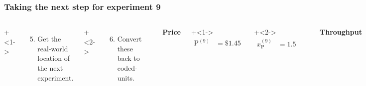 \documentclass[handout,11pt,aspectratio=169,mathserif]{beamer}
\begin{document}
\begin{frame}\frametitle{Taking the next step for experiment 9}
	\begin{columns}[T]

			\vspace{1cm}
			\onslide+<1->{
				{\tiny 
					\begin{enumerate}\setcounter{enumi}{4}
						\item	Get the real-world location
						of the next experiment.
					\end{enumerate}
				
				\par}
			}
			
			\onslide+<2->{
				{\tiny 
					\begin{enumerate}\setcounter{enumi}{5}
						\item	Convert these back to coded-units.
					\end{enumerate}
				
				\par}
			}
			
				
			\rule[3mm]{0.01cm}{25mm}%
			
			
			\centerline{\textbf{Price}}
			
	
			\onslide+<1->{
				\begin{align*} 
					\text{P}^{(9)} &= \$1.45
				\end{align*}
			}
			
			\vspace{-1.1cm}
			\onslide+<2->{
				\begin{align*} 
					x_\text{P}^{(9)} &= 1.5
				\end{align*}
			}
		
			\rule[3mm]{0.01cm}{30mm}%
			
			\centerline{\textbf{Throughput}}
			
			\onslide+<1->{
				\begin{align*} 
					\text{T}^{(9)} &= 337 ~\text{parts per hour}
				\end{align*}
			}
			
			\vspace{-1.1cm}
			\onslide+<2->{	
				\begin{align*} 
					x_\text{T}^{(9)} &= \dfrac{337 - 334}{\tfrac{1}{2}(8)} = 0.75~(\text{not $0.718$})
				\end{align*}
			}
	\end{columns}


\end{frame}
\end{document}
